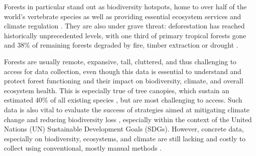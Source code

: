 

Forests in particular stand out as biodiversity hotspots, home to over half of the world's vertebrate species \cite{Pillay2022} as well as providing essential ecosystem services and climate regulation \cite{Brockerhoff2017}. They are also under grave threat: deforestation has reached historically unprecedented levels, with one third of primary tropical forests gone \cite{Krogh2021} and 38\% of remaining forests degraded by fire, timber extraction or drought \cite{Lapola2023}.

Forests are usually remote, expansive, tall, cluttered, and thus challenging to access for data collection, even though this data is essential to understand and protect forest functioning and their impact on biodiversity, climate, and overall ecosystem health. This is especially true of tree canopies, which sustain an estimated 40\% of all existing species \cite{Ozanne2003d}, but are most challenging to access. Such data is also vital to evaluate the success of strategies aimed at mitigating climate change and reducing biodiversity loss \cite{Gonzalez2023}, especially within the context of the United Nations (UN) Sustainable Development Goals (SDGs). However, concrete data, especially on biodiversity, ecosystems, and climate are still lacking \cite{Goessmann2023} and costly to collect using conventional, mostly manual methods \cite{Cannon2021, UNEnvironment2019}. 

